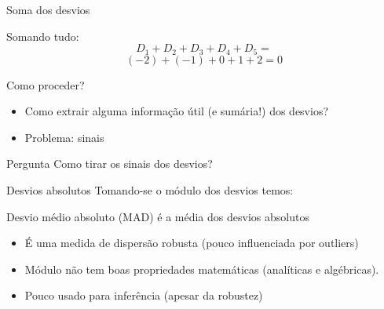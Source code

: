 \documentclass{beamer}
\begin{document}
\begin{frame}{Soma dos desvios}
  \begin{example}
    Somando tudo:
    \begin{displaymath}
    D_1 + D_2 + D_3 + D_4 + D_5 =
  \end{displaymath}
  \begin{displaymath}
    (-2) + (-1) + 0 + 1 + 2 = 0
  \end{displaymath}
  \end{example}
\end{frame}

\begin{frame}{Como proceder?}
  \begin{itemize}
  \item Como extrair alguma informação útil (e sumária!) dos desvios?
  \item Problema: sinais
  \end{itemize}
  \begin{block}{Pergunta}
    Como tirar os sinais dos desvios?
  \end{block}
\end{frame}

\begin{frame}{Desvios absolutos}
  Tomando-se o módulo dos desvios temos:

  \begin{definition}
    Desvio médio absoluto (MAD) é a média dos desvios absolutos
  \end{definition}

  \begin{itemize}
  \item É uma medida de dispersão robusta (pouco influenciada por
    outliers)
  \item Módulo não tem boas propriedades matemáticas (analíticas e
    algébricas).
  \item Pouco usado para inferência (apesar da robustez)
  \end{itemize}
\end{frame}
\end{document}
